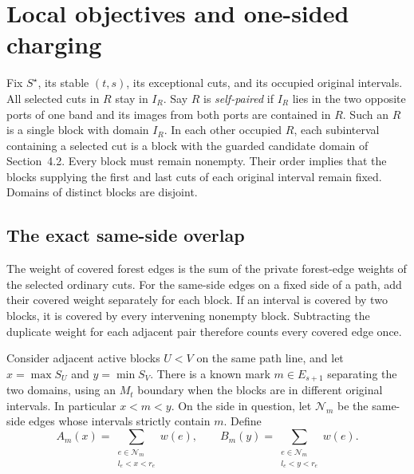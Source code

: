 \documentclass[10pt,letterpaper]{article}
\begin{document}
\section{Local objectives and one-sided charging}
Fix \(S^\star\), its stable \((t,s)\), its exceptional cuts, and its occupied original intervals. All selected cuts in \(R\) stay in \(I_R\). Say \(R\) is \emph{self-paired} if \(I_R\) lies in the two opposite ports of one band and its images from both ports are contained in \(R\). Such an \(R\) is a single block with domain \(I_R\). In each other occupied \(R\), each subinterval containing a selected cut is a block with the guarded candidate domain of Section~4.2. Every block must remain nonempty. Their order implies that the blocks supplying the first and last cuts of each original interval remain fixed. Domains of distinct blocks are disjoint.

\subsection{The exact same-side overlap}
The weight of covered forest edges is the sum of the private forest-edge weights of the selected ordinary cuts. For the same-side edges on a fixed side of a path, add their covered weight separately for each block. If an interval is covered by two blocks, it is covered by every intervening nonempty block. Subtracting the duplicate weight for each adjacent pair therefore counts every covered edge once.

Consider adjacent active blocks \(U<V\) on the same path line, and let \(x=\max S_U\) and \(y=\min S_V\). There is a known mark \(m\in E_{s+1}\) separating the two domains, using an \(M_t\) boundary when the blocks are in different original intervals. In particular \(x<m<y\). On the side in question, let \(\mathcal N_m\) be the same-side edges whose intervals strictly contain \(m\). Define
\[
 A_m(x)=\sum_{\substack{e\in\mathcal N_m\\l_e<x<r_e}}w(e),
 \qquad
 B_m(y)=\sum_{\substack{e\in\mathcal N_m\\l_e<y<r_e}}w(e).
\]
\end{document}
